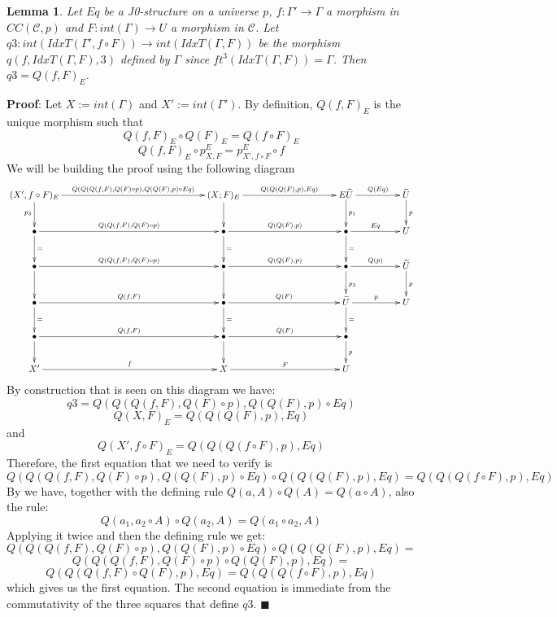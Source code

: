 \documentclass[12pt]{article}
\numberwithin{equation}{section}
\newenvironment{myproof}{{\bf Proof}:}{$\blacksquare$ \vskip 5mm }
\newtheorem{lemma}[proposition]{Lemma}
\newcommand{\llabel}[1]{\label{#1}}
\newcommand{\sr}{\rightarrow}
\newcommand{\wt}{\widetilde}
\newcommand{\BB}{{\bullet}}
\newcommand{\toCC}{CC} %
\begin{document}
\begin{lemma}
\llabel{2015.04.04.l4} Let $Eq$ be a J0-structure on a universe $p$,
$f:\Gamma'\sr \Gamma$ a morphism in $\toCC({\mathcal C},p)$ and $F:int(\Gamma)\sr
U$ a morphism in $\mathcal C$.  Let $q3:int(IdxT(\Gamma',f\circ F))\sr
int(IdxT(\Gamma,F))$ be the morphism $q(f,IdxT(\Gamma,F),3)$ defined by
$\Gamma$ since $ft^3(IdxT(\Gamma,F))=\Gamma$. Then $q3=Q(f,F)_{E}$.
\end{lemma}
%
\begin{myproof}
Let $X:=int(\Gamma)$ and $X':=int(\Gamma')$. By definition, $Q(f,F)_{E}$ is the
unique morphism such that
%
$$Q(f,F)_{E}\circ Q(F)_{E}=Q(f\circ F)_{E}$$
$$Q(f,F)_{E}\circ p^{E}_{X,F}=p^{E}_{X',f\circ F}\circ f$$
%
We will be building the proof using the following diagram
%
$$
\begin{xy}
          \xymatrix@C=4pc{ (X',f\circ F)_{E} \ar[rrr]^-{Q(Q(Q(f,F),Q(F)\circ
              p),Q(Q(F),p)\circ Eq)} \ar[d]_{p_3} &&& (X;F)_{E}
            \ar[rr]^-{Q(Q(Q(F),p),Eq)} \ar[d] && E\wt{U} \ar[r]^-{Q(Eq)}
            \ar[d]^{p_1} & \wt{U} \ar[d]^{p}\\ \BB
            \ar[rrr]^-{Q(Q(f,F),Q(F)\circ p)} \ar[d]^{=} &&& \BB
            \ar[rr]^-{Q(Q(F),p)} \ar[d]^{=} && \BB \ar[r]^-{Eq} \ar[d]^{=}&
            U\\ \BB \ar[rrr]^-{Q(Q(f,F),Q(F)\circ p)} \ar[d] &&& \BB
            \ar[rr]^-{Q(Q(F),p)} \ar[d] && \BB \ar[r]^-{Q(p)} \ar[d]^{p_2}&
            \wt{U} \ar[d]^{p}\\ \BB \ar[rrr]^-{Q(f,F)} \ar[d]^{=}&&& \BB
            \ar[rr]^-{Q(F)} \ar[d]^{=} && \wt{U} \ar[r]^-{p} \ar[d]^{=} & U
            \\ \BB \ar[rrr]^-{Q(f,F)} \ar[d] &&& \BB \ar[rr]^-{Q(F)} \ar[d] &&
            \BB \ar[d]^{p}\\ X' \ar[rrr]^-{f} &&& X \ar[rr]^-{F} && U }
\end{xy}
$$
%
By construction that is seen on this diagram we have:
%
$$q3=Q(Q(Q(f,F),Q(F)\circ p),Q(Q(F),p)\circ Eq)$$
$$Q(X,F)_{E}=Q(Q(Q(F),p),Eq)$$
%
and
%
$$Q(X', f\circ F)_{E}=Q(Q(Q(f\circ F),p),Eq)$$
%
Therefore, the first equation that we need to verify is
%
$$Q(Q(Q(f,F),Q(F)\circ p),Q(Q(F),p)\circ Eq)\circ Q(Q(Q(F),p),Eq)=Q(Q(Q(f\circ
F),p),Eq)$$
%
By \cite[Lemma 3.2]{fromunivwithPi} we have, together with the defining rule
$Q(a,A)\circ Q(A)=Q(a\circ A)$, also the rule:
%
$$Q(a_1,a_2\circ A)\circ Q(a_2,A)=Q(a_1\circ a_2, A)$$
%
Applying it twice and then the defining rule we get:
%
$$Q(Q(Q(f,F),Q(F)\circ p),Q(Q(F),p)\circ Eq)\circ Q(Q(Q(F),p),Eq)=$$
$$Q(Q(Q(f,F),Q(F)\circ p)\circ Q(Q(F),p), Eq)=$$
$$Q(Q(Q(f,F)\circ Q(F),p),Eq)=Q(Q(Q(f\circ F),p),Eq)$$
%
which gives us the first equation. The second equation is immediate from the
commutativity of the three squares that define $q3$.
\end{myproof}
\end{document}
